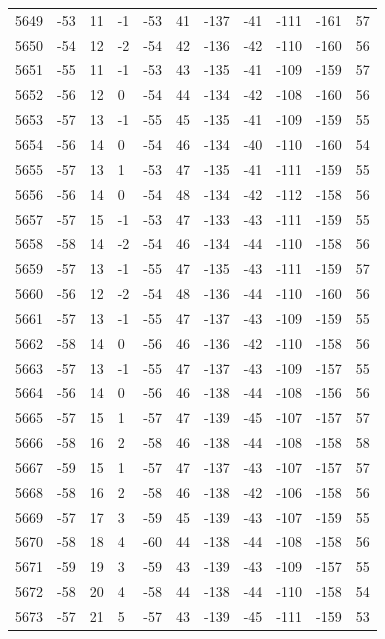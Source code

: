\begin{table}[H]
\begin{tabular}{lllllllllll}
5649 & -53 & 11 & -1 & -53 & 41 & -137 & -41 & -111 & -161 & 57 \\
5650 & -54 & 12 & -2 & -54 & 42 & -136 & -42 & -110 & -160 & 56 \\
5651 & -55 & 11 & -1 & -53 & 43 & -135 & -41 & -109 & -159 & 57 \\
5652 & -56 & 12 & 0 & -54 & 44 & -134 & -42 & -108 & -160 & 56 \\
5653 & -57 & 13 & -1 & -55 & 45 & -135 & -41 & -109 & -159 & 55 \\
5654 & -56 & 14 & 0 & -54 & 46 & -134 & -40 & -110 & -160 & 54 \\
5655 & -57 & 13 & 1 & -53 & 47 & -135 & -41 & -111 & -159 & 55 \\
5656 & -56 & 14 & 0 & -54 & 48 & -134 & -42 & -112 & -158 & 56 \\
5657 & -57 & 15 & -1 & -53 & 47 & -133 & -43 & -111 & -159 & 55 \\
5658 & -58 & 14 & -2 & -54 & 46 & -134 & -44 & -110 & -158 & 56 \\
5659 & -57 & 13 & -1 & -55 & 47 & -135 & -43 & -111 & -159 & 57 \\
5660 & -56 & 12 & -2 & -54 & 48 & -136 & -44 & -110 & -160 & 56 \\
5661 & -57 & 13 & -1 & -55 & 47 & -137 & -43 & -109 & -159 & 55 \\
5662 & -58 & 14 & 0 & -56 & 46 & -136 & -42 & -110 & -158 & 56 \\
5663 & -57 & 13 & -1 & -55 & 47 & -137 & -43 & -109 & -157 & 55 \\
5664 & -56 & 14 & 0 & -56 & 46 & -138 & -44 & -108 & -156 & 56 \\
5665 & -57 & 15 & 1 & -57 & 47 & -139 & -45 & -107 & -157 & 57 \\
5666 & -58 & 16 & 2 & -58 & 46 & -138 & -44 & -108 & -158 & 58 \\
5667 & -59 & 15 & 1 & -57 & 47 & -137 & -43 & -107 & -157 & 57 \\
5668 & -58 & 16 & 2 & -58 & 46 & -138 & -42 & -106 & -158 & 56 \\
5669 & -57 & 17 & 3 & -59 & 45 & -139 & -43 & -107 & -159 & 55 \\
5670 & -58 & 18 & 4 & -60 & 44 & -138 & -44 & -108 & -158 & 56 \\
5671 & -59 & 19 & 3 & -59 & 43 & -139 & -43 & -109 & -157 & 55 \\
5672 & -58 & 20 & 4 & -58 & 44 & -138 & -44 & -110 & -158 & 54 \\
5673 & -57 & 21 & 5 & -57 & 43 & -139 & -45 & -111 & -159 & 53 \\

\end{tabular}
\end{table}
